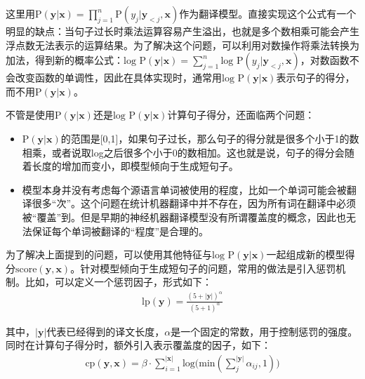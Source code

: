\parinterval 这里用P$(\mathbf{y} | \mathbf{x}) = \prod_{j=1}^n \textrm{P}(y_j | \mathbf{y}_{<j},\mathbf{x}) $作为翻译模型。直接实现这个公式有一个明显的缺点：当句子过长时乘法运算容易产生溢出，也就是多个数相乘可能会产生浮点数无法表示的运算结果。为了解决这个问题，可以利用对数操作将乘法转换为加法，得到新的概率公式：$\textrm{log P}(\mathbf{y} | \mathbf{x}) = \sum_{j=1}^n \textrm{log P} (y_j | \mathbf{y}_{<j}, \mathbf{x}) $，对数函数不会改变函数的单调性，因此在具体实现时，通常用$\textrm{log P}(\mathbf{y} | \mathbf{x})$表示句子的得分，而不用$\textrm{P}(\mathbf{y} | \mathbf{x})$。

\parinterval 不管是使用$\textrm{P}(\mathbf{y} | \mathbf{x})$还是$\textrm{log P}(\mathbf{y} | \mathbf{x})$计算句子得分，还面临两个问题：

\begin{itemize}
\vspace{0.5em}
\item $\textrm{P}(\mathbf{y} | \mathbf{x})$的范围是[0,1]，如果句子过长，那么句子的得分就是很多个小于1的数相乘，或者说取log之后很多个小于0的数相加。这也就是说，句子的得分会随着长度的增加而变小，即模型倾向于生成短句子。
\vspace{0.5em}
\item 模型本身并没有考虑每个源语言单词被使用的程度，比如一个单词可能会被翻译很多``次''。这个问题在统计机器翻译中并不存在，因为所有词在翻译中必须被``覆盖''到。但是早期的神经机器翻译模型没有所谓覆盖度的概念，因此也无法保证每个单词被翻译的``程度''是合理的\cite{li-etal-2018-simple,TuModeling}。
\vspace{0.5em}
\end{itemize}

\parinterval 为了解决上面提到的问题，可以使用其他特征与$\textrm{log P}(\mathbf{y} | \mathbf{x})$一起组成新的模型得分$\textrm{score} ( \mathbf{y} , \mathbf{x})$。针对模型倾向于生成短句子的问题，常用的做法是引入惩罚机制。比如，可以定义一个惩罚因子，形式如下：
\begin{eqnarray}
\textrm{lp}(\mathbf{y}) = \frac {(5+ |\mathbf{y}|)^{\alpha}} {(5+1)^{\alpha}}
\label{eq:6-39}
\end{eqnarray}

\noindent 其中，$|\mathbf{y}|$代表已经得到的译文长度，$\alpha$是一个固定的常数，用于控制惩罚的强度。同时在计算句子得分时，额外引入表示覆盖度的因子，如下：
\begin{eqnarray}
\textrm{cp}(\mathbf{y} , \mathbf{x}) = \beta \cdot \sum_{i=1}^{|\mathbf{x}|} \textrm{log} \big(\textrm{min}(\sum_j^{|\mathbf{y}|} \alpha_{ij},1 ) \big)
\label{eq:6-40}
\end{eqnarray}

